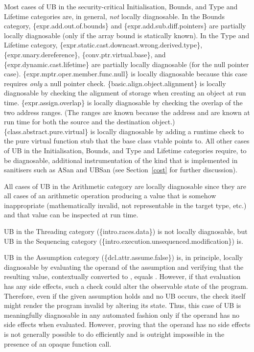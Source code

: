Most cases of UB in the security-critical Initialisation, Bounds, and Type and Lifetime categories are, in general, \emph{not} locally diagnosable.  In the Bounds category, 
\{expr.add.out.of.bounds\} 
and \{expr.add.sub.diff.pointers\} 
are partially locally diagnosable (only if the array bound is statically known). In the Type and Lifetime category,
\{expr.static.cast.downcast.wrong.derived.type\},
\{expr.unary.dereference\}, 
\{conv.ptr.virtual.base\}, and
\{expr.dynamic.cast.lifetime\}
are partially locally diagnosable (for the null pointer case).
\{expr.mptr.oper.member.func.null\} is locally diagnosable because this case requires \emph{only} a null pointer check.
\{basic.align.object.alignment\} is locally diagnosable by checking the alignment of storage when creating an object at run time.
\{expr.assign.overlap\} is locally diagnosable by checking the overlap of the two address ranges. (The ranges are known because the address and  are known at run time for both the source and the destination object.) \{class.abstract.pure.virtual\} is locally diagnosable by adding a runtime check to  the pure virtual function stub that the base class vtable points to. All other cases of UB in the Initialisation, Bounds, and Type and Lifetime categories require, to be diagnosable, additional instrumentation of the kind that is implemented in sanitisers such as ASan and UBSan (see Section~\ref{cost} for further discussion).

All cases of UB in the Arithmetic category are locally diagnosable since they are all cases of an arithmetic operation producing a value that is somehow inappropriate (mathematically invalid, not representable in the target type, etc.) and that value can be inspected at run time.

UB in the Threading category (\{intro.races.data\}) is not locally diagnosable, but UB in the Sequencing category (\{intro.execution.unsequenced.modification\}) is. 

UB in the Assumption category (\{dcl.attr.assume.false\}) is, in principle, locally diagnosable by evaluating the operand of the assumption and verifying that the resulting value, contextually converted to , equals . However, if that evaluation has any side effects, such a check could alter the observable state of the program. Therefore, even if the given assumption holds and no UB occurs, the check itself might render the program invalid by altering its state. Thus, this case of UB is  meaningfully diagnosable in any automated fashion only if the operand has no side effects when evaluated. However, proving that the operand has no side effects is not generally possible to do efficiently and is outright impossible in the presence of an opaque function call.

